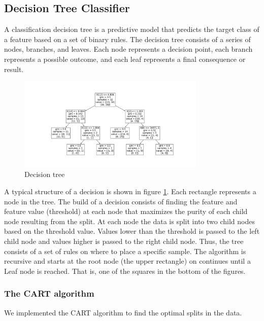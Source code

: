 \subsection{Decision Tree Classifier} \label{sec:method_descion_tree} 
A classification decision tree is a predictive model that predicts the target
class of a feature based on a set of binary rules. The decision tree consists of a series of
nodes, branches, and leaves. Each node represents a decision point, each branch
represents a possible outcome, and each leaf represents a final consequence or
result. 

\begin{figure}[H]
    \centering
    \includegraphics[width=0.8\textwidth]{Figures/descion_tree.png}
    \caption{Decision tree}  
    \label{fig:descision_tree} 
\end{figure}

A typical structure of a decision is shown in figure \ref{fig:descision_tree}. Each rectangle
represents a node in the tree. The build of a decision consists of finding
the feature and feature value (threshold) at each node that maximizes the
purity of each child node resulting from the split. At each node the data is
split into two child nodes based on the threshold value. Values lower than the threshold is
passed to the left child node and values higher is passed to the right child
node. Thus, the tree consists of a set of rules on where to place a specific sample. The algorithm is recursive and starts at the
root node (the upper rectangle) on continues until a Leaf node is reached.
That is, one of the squares in the bottom of the figures.     


\subsubsection{The CART algorithm} \hfill

We implemented the CART algorithm to find the optimal splits in the data.  

